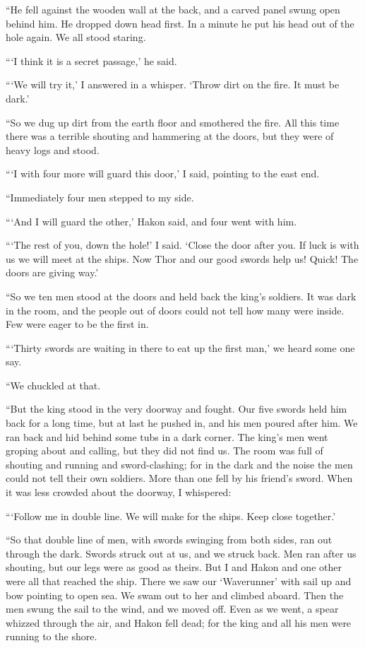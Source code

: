 ``He fell against the wooden wall at the back, and a carved panel swung
open behind him. He dropped down head first. In a minute he put his head
out of the hole again. We all stood staring.

```I think it is a secret passage,' he said.

```We will try it,' I answered in a whisper. `Throw dirt on the fire. It
must be dark.'

``So we dug up dirt from the earth floor and smothered the fire. All this
time there was a terrible shouting and hammering at the doors, but they
were of heavy logs and stood.

```I with four more will guard this door,' I said, pointing to the east
end.

``Immediately four men stepped to my side.

```And I will guard the other,' Hakon said, and four went with him.

```The rest of you, down the hole!' I said. `Close the door after you. If
luck is with us we will meet at the ships. Now Thor and our good swords
help us! Quick! The doors are giving way.'

``So we ten men stood at the doors and held back the king's soldiers. It
was dark in the room, and the people out of doors could not tell how
many were inside. Few were eager to be the first in.

```Thirty swords are waiting in there to eat up the first man,' we heard
some one say.

``We chuckled at that.

``But the king stood in the very doorway and fought. Our five swords held
him back for a long time, but at last he pushed in, and his men poured
after him. We ran back and hid behind some tubs in a dark corner. The
king's men went groping about and calling, but they did not find us. The
room was full of shouting and running and sword-clashing; for in the
dark and the noise the men could not tell their own soldiers. More than
one fell by his friend's sword. When it was less crowded about the
doorway, I whispered:

```Follow me in double line. We will make for the ships. Keep close
together.'

``So that double line of men, with swords swinging from both sides, ran
out through the dark. Swords struck out at us, and we struck back. Men
ran after us shouting, but our legs were as good as theirs. But I and
Hakon and one other were all that reached the ship. There we saw our
`Waverunner' with sail up and bow pointing to open sea. We swam out to
her and climbed aboard. Then the men swung the sail to the wind, and we
moved off. Even as we went, a spear whizzed through the air, and Hakon
fell dead; for the king and all his men were running to the shore.

